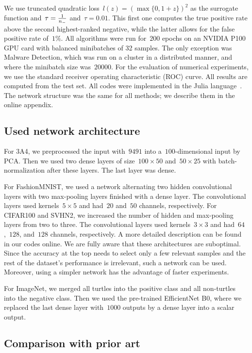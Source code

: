 We use truncated quadratic loss~$l(z) = (\max\{0, 1 + z\})^2$ as the surrogate function and~$\tau=\frac{1}{n_{-}}$ and~$\tau=0.01$. This first one computes the true positive rate above the second highest-ranked negative, while the latter allows for the false positive rate of~$1\%$. All algorithms were run for~$200$ epochs on an NVIDIA P100 GPU card with balanced minibatches of 32 samples. The only exception was Malware Detection, which was run on a cluster in a distributed manner, and where the minibatch size was~$20000$. For the evaluation of numerical experiments, we use the standard receiver operating characteristic (ROC) curve. All results are computed from the test set. All codes were implemented in the Julia language~\cite{bezanson2017julia}. The network structure was the same for all methods; we describe them in the online appendix.


\subsection{Used network architecture}\label{app:network}

For 3A4, we preprocessed the input with~$9491$ into a~$100$-dimensional input by PCA. Then we used two dense layers of size~$100\times 50$ and~$50\times 25$ with batch-normalization after these layers. The last layer was dense.

For FashionMNIST, we used a network alternating two hidden convolutional layers with two max-pooling layers finished with a dense layer. The convolutional layers used kernels~$5\times 5$ and had~$20$ and~$50$ channels, respectively. For CIFAR100 and SVHN2, we increased the number of hidden and max-pooling layers from two to three. The convolutional layers used kernels~$3\times 3$ and had~$64$,~$128$, and~$128$ channels, respectively. A more detailed description can be found in our codes online. We are fully aware that these architectures are suboptimal. Since the accuracy at the top needs to select only a few relevant samples and the rest of the dataset's performance is irrelevant, such a network can be used. Moreover, using a simpler network has the advantage of faster experiments.

For ImageNet, we merged all turtles into the positive class and all non-turtles into the negative class. Then we used the pre-trained EfficientNet B0, where we replaced the last dense layer with~$1000$ outputs by a dense layer into a scalar output.

\subsection{Comparison with prior art}\label{sec:comparison}

